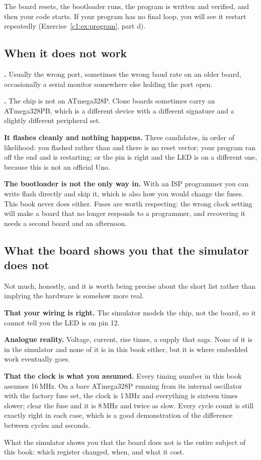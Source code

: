 The board resets, the bootloader runs, the program is written and verified, and then your code
starts. If your program has no final loop, you will see it restart repeatedly
(Exercise~\ref{c1:ex:program}, part d).

\subsection{When it does not work}
\label{c2:sec:notwork}
\textbf{.} Usually the wrong port, sometimes the wrong baud rate
on an older board, occasionally a serial monitor somewhere else holding the port open.

\textbf{.} The chip is not an ATmega328P. Clone boards
sometimes carry an ATmega328PB, which is a different device with a different signature and a
slightly different peripheral set.

\textbf{It flashes cleanly and nothing happens.} Three candidates, in order of likelihood: you
flashed  rather than  and there is no reset vector; your program ran
off the end and is restarting; or the pin is right and the LED is on a different one, because this
is not an official Uno.

\textbf{The bootloader is not the only way in.} With an ISP programmer you can write flash directly
and skip it, which is also how you would change the fuses. This book never does either. Fuses are
worth respecting: the wrong clock setting will make a board that no longer responds to a
programmer, and recovering it needs a second board and an afternoon.

\subsection{What the board shows you that the simulator does not}
\label{c2:sec:boardshows}
Not much, honestly, and it is worth being precise about the short list rather than implying the
hardware is somehow more real.

\textbf{That your wiring is right.} The simulator models the chip, not the board, so it cannot tell
you the LED is on pin 12.

\textbf{Analogue reality.} Voltage, current, rise times, a supply that sags. None of it is in the
simulator and none of it is in this book either, but it is where embedded work eventually goes.

\textbf{That the clock is what you assumed.} Every timing number in this book assumes 16\,MHz. On a
bare ATmega328P running from its internal oscillator with the factory  fuse set, the
clock is 1\,MHz and everything is sixteen times slower; clear the fuse and it is 8\,MHz and twice as
slow. Every cycle count is still exactly right in each case, which is a good demonstration of the
difference between cycles and seconds.

What the simulator shows you that the board does not is the entire subject of this book: which
register changed, when, and what it cost.
